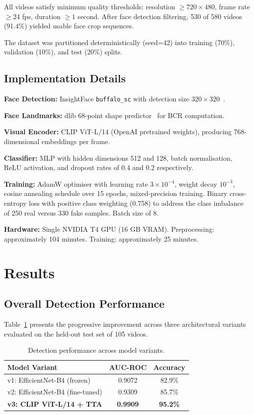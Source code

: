 \documentclass[11pt, twocolumn]{article}
\begin{document}
All videos satisfy minimum quality thresholds: resolution $\geq 720 \times 480$, frame rate $\geq 24$ fps, duration $\geq 1$ second. After face detection filtering, 530 of 580 videos (91.4\%) yielded usable face crop sequences.

The dataset was partitioned deterministically (seed=42) into training (70\%), validation (10\%), and test (20\%) splits.

\subsection{Implementation Details}

\textbf{Face Detection:} InsightFace \texttt{buffalo\_sc} with detection size $320 \times 320$~\cite{deng2019arcface}.

\textbf{Face Landmarks:} dlib 68-point shape predictor~\cite{kazemi2014dlib} for BCR computation.

\textbf{Visual Encoder:} CLIP ViT-L/14 (OpenAI pretrained weights), producing 768-dimensional embeddings per frame.

\textbf{Classifier:} MLP with hidden dimensions 512 and 128, batch normalisation, ReLU activation, and dropout rates of 0.4 and 0.2 respectively.

\textbf{Training:} AdamW optimiser with learning rate $3 \times 10^{-4}$, weight decay $10^{-3}$, cosine annealing schedule over 15 epochs, mixed-precision training. Binary cross-entropy loss with positive class weighting (0.758) to address the class imbalance of 250 real versus 330 fake samples. Batch size of 8.

\textbf{Hardware:} Single NVIDIA T4 GPU (16 GB VRAM). Preprocessing: approximately 104 minutes. Training: approximately 25 minutes.

\section{Results}

\subsection{Overall Detection Performance}

Table~\ref{tab:main_results} presents the progressive improvement across three architectural variants evaluated on the held-out test set of 105 videos.

\begin{table}[H]
\centering
\caption{Detection performance across model variants.}
\label{tab:main_results}
\small
\begin{tabular}{lcc}
\toprule
Model Variant & AUC-ROC & Accuracy \\
\midrule
v1: EfficientNet-B4 (frozen) & 0.9072 & 82.9\% \\
v2: EfficientNet-B4 (fine-tuned) & 0.9309 & 85.7\% \\
\textbf{v3: CLIP ViT-L/14 + TTA} & \textbf{0.9909} & \textbf{95.2\%} \\
\bottomrule
\end{tabular}
\end{table}
\end{document}

